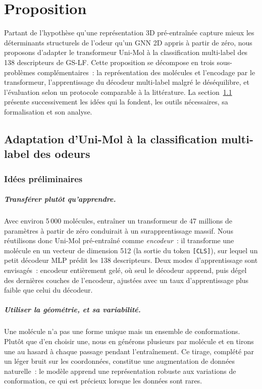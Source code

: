 \chapter{Proposition}
\label{chap:Propositions}

Partant de l'hypothèse qu'une représentation 3D pré-entraînée capture mieux les déterminants structurels de l'odeur qu'un GNN 2D appris à partir de zéro, nous proposons d'adapter le transformeur Uni-Mol à la classification multi-label des 138 descripteurs de GS-LF.
Cette proposition se décompose en trois sous-problèmes complémentaires~: la représentation des molécules et l'encodage par le transformeur, l'apprentissage du décodeur multi-label malgré le déséquilibre, et l'évaluation selon un protocole comparable à la littérature.
La section~\ref{sec:PropositionUniMol} présente successivement les idées qui la fondent, les outils nécessaires, sa formalisation et son analyse.


\section{Adaptation d'Uni-Mol à la classification multi-label des odeurs}
\label{sec:PropositionUniMol}

\subsection{Idées préliminaires}
\label{sec:IdeesPreliminaires}

\paragraph{Transférer plutôt qu'apprendre.}
Avec environ 5\,000 molécules, entraîner un transformeur de 47 millions de paramètres à partir de zéro conduirait à un surapprentissage massif.
Nous réutilisons donc Uni-Mol pré-entraîné comme \emph{encodeur}~: il transforme une molécule en un vecteur de dimension 512 (la sortie du token \texttt{[CLS]}), sur lequel un petit décodeur MLP prédit les 138 descripteurs.
Deux modes d'apprentissage sont envisagés~: encodeur entièrement gelé, où seul le décodeur apprend, puis dégel des dernières couches de l'encodeur, ajustées avec un taux d'apprentissage plus faible que celui du décodeur.

\paragraph{Utiliser la géométrie, et sa variabilité.}
Une molécule n'a pas une forme unique mais un ensemble de conformations.
Plutôt que d'en choisir une, nous en générons plusieurs par molécule et en tirons une au hasard à chaque passage pendant l'entraînement.
Ce tirage, complété par un léger bruit sur les coordonnées, constitue une augmentation de données naturelle~: le modèle apprend une représentation robuste aux variations de conformation, ce qui est précieux lorsque les données sont rares.

